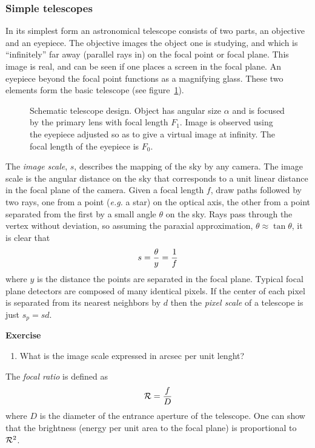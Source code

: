 \documentclass{article}
\def\cl#1{{\cal #1}}               %
\begin{document}
\subsubsection{Simple telescopes}

In its simplest form an astronomical telescope consists of two parts, an 
objective and an eyepiece. The objective images the object one is studying,
and which is ``infinitely'' far away (parallel rays in) on the focal point
or focal plane. This image is real, and can be seen if one places a screen 
in the focal plane. An eyepiece beyond the focal point functions as a 
magnifying glass. These two elements form the basic telescope (see figure~\ref{fig:telescope}).

\begin{figure}[th]
  \hfil{}\hfil
  \caption{Schematic telescope design. Object has angular size $\alpha$ and is focused by 
the primary lens with focal length $F_1$. Image is observed using the eyepiece adjusted so
as to give a virtual image at infinity. The focal length of the eyepiece is $F_0$. }
  \label{fig:telescope}
\end{figure}

The {\it image scale}, $s$, describes the mapping of the sky by any camera. The image scale
is the angular distance on the sky that corresponds to a unit linear distance in the focal 
plane of the camera. Given a focal length $f$, draw paths followed by two rays, one from 
a point ({\it e.g.} a star) on the optical axis, the other from a point separated from the 
first by a small angle $\theta$ on the sky. Rays pass through the vertex without 
deviation, so assuming the paraxial approximation, $\theta\approx\tan\theta$, it is clear that
\[
s={\theta\over y}={1\over f}
\]
where $y$ is the distance the points are separated in the focal plane. Typical focal plane 
detectors are composed of many identical pixels. If the center of each pixel is separated 
from its nearest neighbors by $d$ then the {\it pixel scale} of a telescope is just $s_p=sd$.

{\bf Exercise}

\begin{enumerate}
\setcounter{enumi}{\value{count}}
\item What is the image scale expressed in arcsec per unit lenght?
\setcounter{count}{\value{enumi}} 
\end{enumerate}

The {\it focal ratio} is defined as 
\[
\cl{R}={f\over D}
\]
where $D$ is the diameter of the entrance aperture of the telescope. One can show that the 
brightness (energy per unit area to the focal plane) is proportional to $\cl{R}^2$.
\end{document}
